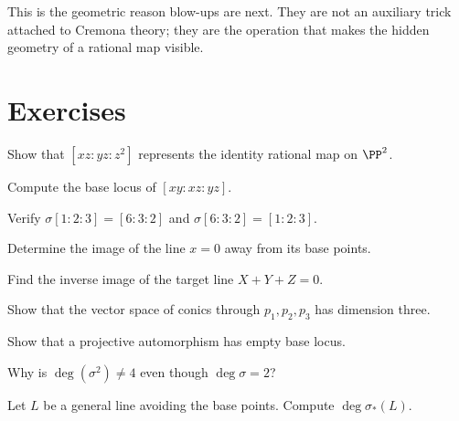 This is the geometric reason blow-ups are next.  They are not an auxiliary trick attached to Cremona theory; they are the operation that makes the hidden geometry of a rational map visible.



\section{Exercises}

\begin{exercise}\label{exr:vi44-01}
Show that \([xz:yz:z^2]\) represents the identity rational map on \(\PP^2\).
\end{exercise}

\begin{exercise}\label{exr:vi44-02}
Compute the base locus of \([xy:xz:yz]\).
\end{exercise}

\begin{exercise}\label{exr:vi44-03}
Verify \(\sigma[1:2:3]=[6:3:2]\) and \(\sigma[6:3:2]=[1:2:3]\).
\end{exercise}

\begin{exercise}\label{exr:vi44-04}
Determine the image of the line \(x=0\) away from its base points.
\end{exercise}

\begin{exercise}\label{exr:vi44-05}
Find the inverse image of the target line \(X+Y+Z=0\).
\end{exercise}

\begin{exercise}\label{exr:vi44-06}
Show that the vector space of conics through \(p_1,p_2,p_3\) has dimension three.
\end{exercise}

\begin{exercise}\label{exr:vi44-07}
Show that a projective automorphism has empty base locus.
\end{exercise}

\begin{exercise}\label{exr:vi44-08}
Why is \(\deg(\sigma^2)\neq4\) even though \(\deg\sigma=2\)?
\end{exercise}

\begin{exercise}\label{exr:vi44-09}
Let \(L\) be a general line avoiding the base points.  Compute \(\deg\sigma_*(L)\).
\end{exercise}

